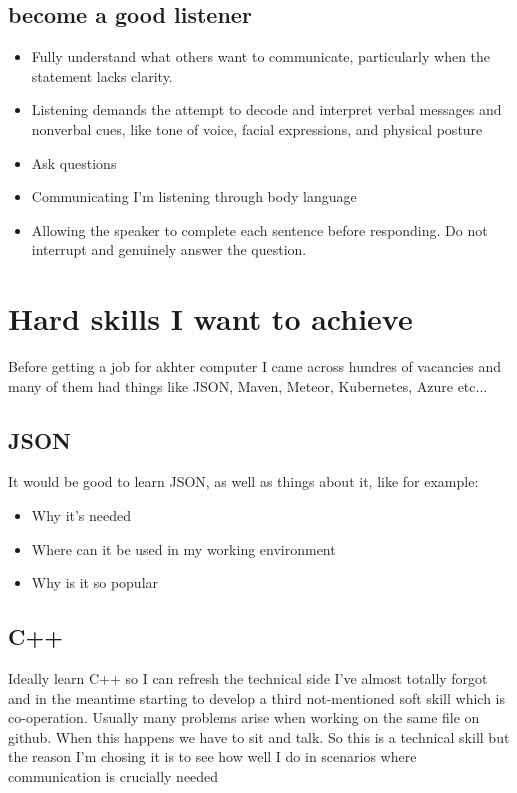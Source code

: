 \documentclass[a4paper,12pt]{article}
\begin{document}
\subsection{become a good listener}
\begin{itemize}
\item Fully understand what others want to communicate, particularly when the statement lacks clarity.
\item Listening demands the attempt to decode and interpret verbal messages and nonverbal cues, like tone of voice, facial expressions, and physical posture
\item Ask questions
\item Communicating I'm listening through body language
\item Allowing the speaker to complete each sentence before responding. Do not interrupt and genuinely answer the question.
\end{itemize}

\section{Hard skills I want to achieve}
Before getting a job for akhter computer I came across hundres of vacancies and many of them had things like JSON, Maven, Meteor, Kubernetes, Azure etc...

\subsection{JSON}
It would be good to learn JSON, as well as things about it, like for example:
\begin {itemize}
\item Why it's needed
\item Where can it be used in my working environment
\item Why is it so popular
\end {itemize}

\subsection{C++}
Ideally learn C++ so I can refresh the technical side I've almost totally forgot and in the meantime starting to develop a third not-mentioned soft skill which is co-operation. Usually many problems arise when working on the same file on github. When this happens we have to sit and talk. So this is a technical skill but the reason I'm chosing it is to see how well I do in scenarios where communication is crucially needed
\clearpage

\printindex
\end{document}
